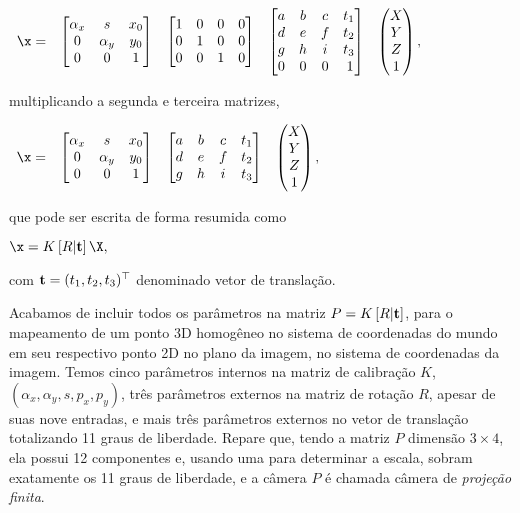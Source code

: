 \begin{center}
$
\begin{array}{ccccc}
\x=
&
\begin{bmatrix}
\alpha_x&s&x_0\\
0&\alpha_y&y_0\\
0&0&1
\end{bmatrix}&
\begin{bmatrix}
1&0&0&0\\
0&1&0&0\\
0&0&1&0
\end{bmatrix}
&
\begin{bmatrix}
a&b&c&t_1\\
d&e&f&t_2\\
g&h&i&t_3\\
0&0&0&\,1
\end{bmatrix}
&
\begin{pmatrix}
X\\
Y\\
Z\\
1
\end{pmatrix},
\end{array}
$
\end{center}
multiplicando a segunda e terceira matrizes,
 
\begin{center}
$
\begin{array}{cccc}
\x=
&
\begin{bmatrix}
\alpha_x&s&x_0\\
0&\alpha_y&y_0\\
0&0&1
\end{bmatrix}&
\begin{bmatrix}
a&b&c&t_1\\
d&e&f&t_2\\
g&h&i&t_3
\end{bmatrix}
&
\begin{pmatrix}
X\\
Y\\
Z\\
1
\end{pmatrix},
\end{array}
$
\end{center}
que pode ser escrita de forma resumida como

\begin{center}
$
\x=K\,[R|{\bf t}]\,\X,
$
\end{center}
com ${\bf t}=(t_1,t_2,t_3)^\top$ denominado vetor de translação.

Acabamos de incluir todos os parâmetros na matriz $P=K\,[R|{\bf t}]$, para o mapeamento de um ponto 3D homogêneo no sistema de coordenadas do mundo em seu respectivo ponto 2D no plano da imagem, no sistema de coordenadas da imagem. Temos cinco parâmetros internos na matriz de calibração $K$, $(\alpha_x,\alpha_y,s,p_x,p_y)$, três parâmetros externos na matriz de rotação $R$, apesar de suas nove entradas, e mais três parâmetros externos no vetor de translação totalizando 11 graus de liberdade. Repare que, tendo a matriz $P$ dimensão $3\times4$, ela possui 12 componentes e, usando uma para determinar a escala, sobram exatamente os 11 graus de liberdade, e a câmera $P$ é chamada câmera de \textit{projeção finita}.

